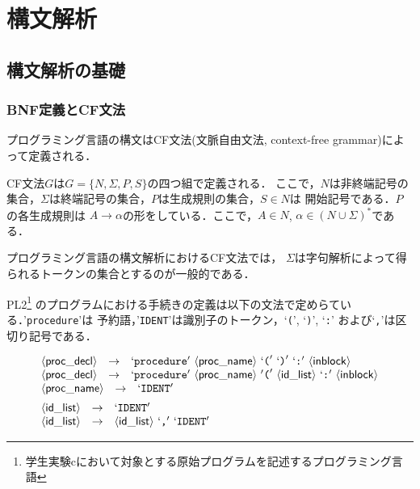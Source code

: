 \documentclass[a4j,dvipdfmx]{jbook}
\begin{document}
\chapter{構文解析}
\section{構文解析の基礎}
\subsection{BNF定義とCF文法}

プログラミング言語の構文はCF文法(文脈自由文法, context-free grammar)によって定義される．

\begin{Def}
  CF文法$G$は$G=\{N,\Sigma,P,S\}$の四つ組で定義される．
  ここで，$N$は非終端記号の集合，$\Sigma$は終端記号の集合，$P$は生成規則の集合，$S\in N$は
  開始記号である．$P$の各生成規則は $A\rightarrow\alpha$の形をしている．ここで，$A\in N$,
  $\alpha\in (N\cup\Sigma)^\ast$である．
\end{Def}

プログラミング言語の構文解析におけるCF文法では，
$\Sigma$は字句解析によって得られるトークンの集合とするのが一般的である．

PL2\footnote{学生実験cにおいて対象とする原始プログラムを記述するプログラミング言語}
のプログラムにおける手続きの定義は以下の文法で定めらている．'\texttt{procedure}'は
予約語，'\texttt{IDENT}'は識別子のトークン，`\texttt{(}', `\texttt{)}', `\texttt{:}'
および`\texttt{,}'は区切り記号である．

\[\begin{array}{l}
    \begin{array}{rcl}
      \tuple{\mathsf{proc\_decl}} & \rightarrow & `\texttt{procedure}'\ \tuple{\mathsf{proc\_name}}\ `\texttt{(}'\ `\texttt{)}'\ `\texttt{:}'\ \tuple{\mathsf{inblock}}              \\
      \tuple{\mathsf{proc\_decl}} & \rightarrow & `\texttt{procedure}'\ \tuple{\mathsf{proc\_name}}\ '\texttt{(}'\ \tuple{\mathsf{id\_list}}\ `\texttt{:}'\ \tuple{\mathsf{inblock}} \\
    \end{array} \\[5pt]
    \begin{array}{rcl}
      \tuple{\mathsf{proc\_name}} & \rightarrow & `\texttt{IDENT}'
    \end{array}                                                                                                                                \\[5pt]
    \begin{array}{rcl}
      \tuple{\mathsf{id\_list}} & \rightarrow & `\texttt{IDENT}'                                          \\
      \tuple{\mathsf{id\_list}} & \rightarrow & \tuple{\mathsf{id\_list}}\ `\texttt{,}'\ `\texttt{IDENT}'
    \end{array}
  \end{array}\]
\end{document}
